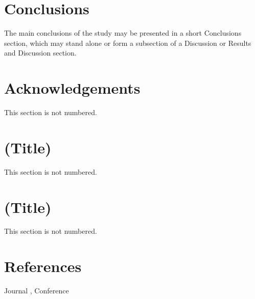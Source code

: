 \documentclass[]{iac}
\begin{document}
\section{Conclusions}
The main conclusions of the study may be presented in a short Conclusions section, which may stand alone or form a subsection of a Discussion or Results and Discussion section.

\section*{Acknowledgements}
This section is not numbered.


\appendix
\renewcommand{\thesection}{Appendix \Alph{section}}

\section{(Title)}
This section is not numbered.
\section{(Title)}
This section is not numbered.

\section*{References}
Journal \cite{VanDerGeer2010}, Conference \cite{Chang2015}


\end{document}
